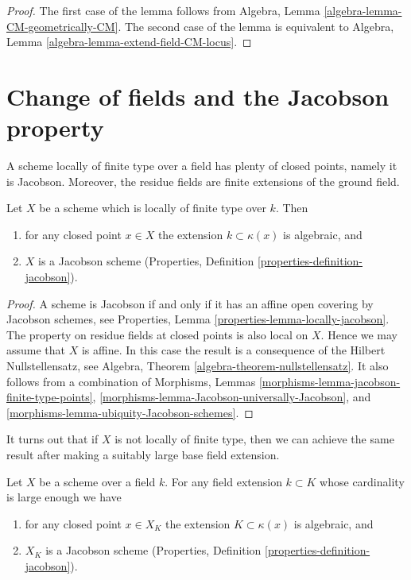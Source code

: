 \begin{proof}
The first case of the lemma follows from
Algebra, Lemma \ref{algebra-lemma-CM-geometrically-CM}.
The second case of the lemma is equivalent to
Algebra, Lemma \ref{algebra-lemma-extend-field-CM-locus}.
\end{proof}







\section{Change of fields and the Jacobson property}
\label{section-overfield}

\noindent
A scheme locally of finite type over a field has plenty of closed
points, namely it is Jacobson. Moreover, the residue fields are
finite extensions of the ground field.

\begin{lemma}
\label{lemma-locally-finite-type-Jacobson}
Let $X$ be a scheme which is locally of finite type over $k$.
Then
\begin{enumerate}
\item for any closed point $x \in X$ the extension $k \subset \kappa(x)$
is algebraic, and
\item $X$ is a Jacobson scheme
(Properties, Definition \ref{properties-definition-jacobson}).
\end{enumerate}
\end{lemma}

\begin{proof}
A scheme is Jacobson if and only if it has an affine open covering
by Jacobson schemes, see
Properties, Lemma \ref{properties-lemma-locally-jacobson}.
The property on residue fields at closed points is also local on $X$.
Hence we may assume that $X$ is affine. In this case the result
is a consequence of the Hilbert Nullstellensatz, see
Algebra, Theorem \ref{algebra-theorem-nullstellensatz}.
It also follows from a combination of
Morphisms, Lemmas \ref{morphisms-lemma-jacobson-finite-type-points},
\ref{morphisms-lemma-Jacobson-universally-Jacobson}, and
\ref{morphisms-lemma-ubiquity-Jacobson-schemes}.
\end{proof}

\noindent
It turns out that if $X$ is not locally of finite type, then we can
achieve the same result after making a suitably large base field extension.

\begin{lemma}
\label{lemma-make-Jacobson}
Let $X$ be a scheme over a field $k$.
For any field extension $k \subset K$ whose cardinality is large enough
we have
\begin{enumerate}
\item for any closed point $x \in X_K$ the extension $K \subset \kappa(x)$
is algebraic, and
\item $X_K$ is a Jacobson scheme
(Properties, Definition \ref{properties-definition-jacobson}).
\end{enumerate}
\end{lemma}


